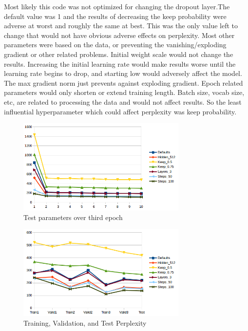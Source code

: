 \documentclass[10pt,a4paper]{article}
\begin{document}
Most likely this code was not optimized for changing the dropout layer.The default value was 1 and the results of decreasing the keep probability were adverse at worst and roughly the same at best. This was the only value left to change that would not have obvious adverse effects on perplexity. Most other parameters were based on the data, or preventing the vanishing/exploding gradient or other related problems. Initial weight scale would not change the results. Increasing the initial learning rate would make results worse until the learning rate begins to drop, and starting low would adversely affect the model. The max gradient norm just prevents against exploding gradient. Epoch related parameters would only shorten or extend training length. Batch size, vocab size, etc, are related to processing the data and would not affect results. So the least influential hyperparameter which could affect perplexity was keep probability.



\begin{figure}[t]
  \begin{center}
    \includegraphics[width=0.75\textwidth]{epochs1.png}
    \caption{Test parameters over third epoch}
  \end{center}
\end{figure}


\begin{figure}[b]
  \begin{center}
    \includegraphics[width=0.75\textwidth] {train-valid-test1.png}
    \caption{Training, Validation, and Test Perplexity}
  \end{center}
\end{figure}
\end{document}
